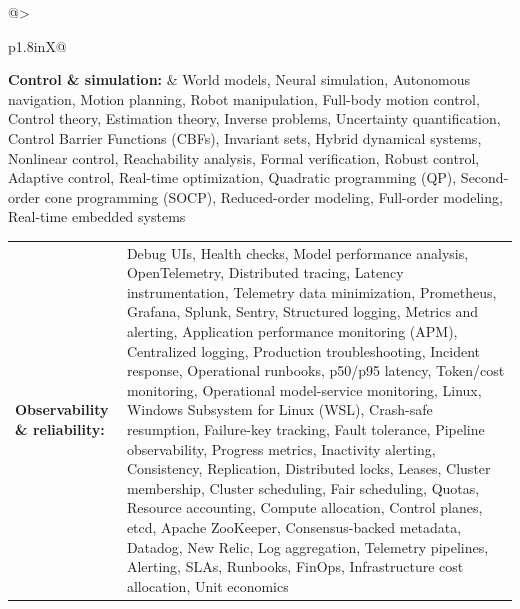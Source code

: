 \documentclass[letterpaper,11pt]{article}
\begin{document}
\par\vspace{2pt}
\begin{tabularx}{\linewidth}{@{}>{\raggedright\arraybackslash}p{1.8in}X@{}}
\textbf{Control \& simulation:} & \footnotesize{World models, Neural simulation, Autonomous navigation, Motion planning, Robot manipulation, Full-body motion control, Control theory, Estimation theory, Inverse problems, Uncertainty quantification, Control Barrier Functions (CBFs), Invariant sets, Hybrid dynamical systems, Nonlinear control, Reachability analysis, Formal verification, Robust control, Adaptive control, Real-time optimization, Quadratic programming (QP), Second-order cone programming (SOCP), Reduced-order modeling, Full-order modeling, Real-time embedded systems}\\
\end{tabularx}
\par\vspace{2pt}
\begin{tabularx}{\linewidth}{@{}>{\raggedright\arraybackslash}p{1.8in}X@{}}
\textbf{Observability \& reliability:} & \footnotesize{Debug UIs, Health checks, Model performance analysis, OpenTelemetry, Distributed tracing, Latency instrumentation, Telemetry data minimization, Prometheus, Grafana, Splunk, Sentry, Structured logging, Metrics and alerting, Application performance monitoring (APM), Centralized logging, Production troubleshooting, Incident response, Operational runbooks, p50/p95 latency, Token/cost monitoring, Operational model-service monitoring, Linux, Windows Subsystem for Linux (WSL), Crash-safe resumption, Failure-key tracking, Fault tolerance, Pipeline observability, Progress metrics, Inactivity alerting, Consistency, Replication, Distributed locks, Leases, Cluster membership, Cluster scheduling, Fair scheduling, Quotas, Resource accounting, Compute allocation, Control planes, etcd, Apache ZooKeeper, Consensus-backed metadata, Datadog, New Relic, Log aggregation, Telemetry pipelines, Alerting, SLAs, Runbooks, FinOps, Infrastructure cost allocation, Unit economics}\\
\end{tabularx}
\par\vspace{2pt}
\end{document}
